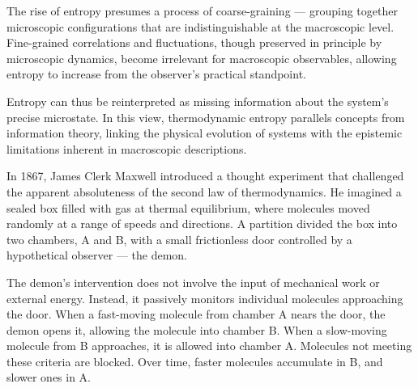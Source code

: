 The rise of entropy presumes a process of coarse-graining — grouping together microscopic configurations that are indistinguishable at the macroscopic level. Fine-grained correlations and fluctuations, though preserved in principle by microscopic dynamics, become irrelevant for macroscopic observables, allowing entropy to increase from the observer’s practical standpoint.

Entropy can thus be reinterpreted as missing information about the system’s precise microstate. In this view, thermodynamic entropy parallels concepts from information theory, linking the physical evolution of systems with the epistemic limitations inherent in macroscopic descriptions.

In 1867, James Clerk Maxwell introduced a thought experiment that challenged the apparent absoluteness of the second law of thermodynamics. He imagined a sealed box filled with gas at thermal equilibrium, where molecules moved randomly at a range of speeds and directions. A partition divided the box into two chambers, A and B, with a small frictionless door controlled by a hypothetical observer — the demon.

The demon’s intervention does not involve the input of mechanical work or external energy. Instead, it passively monitors individual molecules approaching the door. When a fast-moving molecule from chamber A nears the door, the demon opens it, allowing the molecule into chamber B. When a slow-moving molecule from B approaches, it is allowed into chamber A. Molecules not meeting these criteria are blocked. Over time, faster molecules accumulate in B, and slower ones in A.

